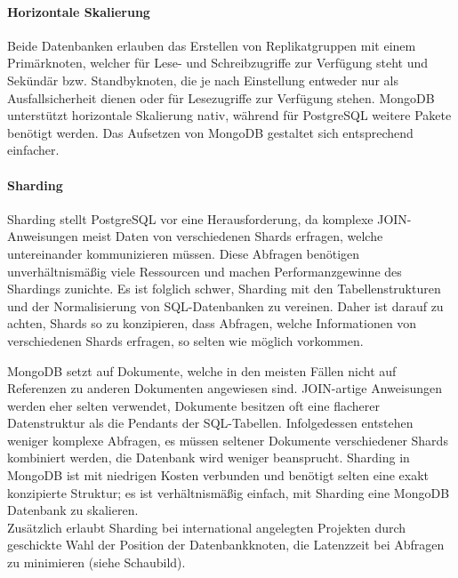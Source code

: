 \paragraph{Horizontale Skalierung\\}
Beide Datenbanken erlauben das Erstellen von Replikatgruppen mit einem Primärknoten, welcher für Lese- und Schreibzugriffe zur Verfügung steht und Sekündär bzw. Standbyknoten, die je nach Einstellung entweder nur als Ausfallsicherheit dienen oder für Lesezugriffe zur Verfügung stehen. MongoDB unterstützt horizontale Skalierung nativ, während für PostgreSQL weitere Pakete benötigt werden. \cite{MG8} Das Aufsetzen von MongoDB gestaltet sich entsprechend einfacher.

\paragraph{Sharding\\}
Sharding stellt PostgreSQL vor eine Herausforderung, da komplexe JOIN-Anweisungen meist Daten von verschiedenen Shards erfragen, welche untereinander kommunizieren müssen. Diese Abfragen benötigen unverhältnismäßig viele Ressourcen und machen Performanzgewinne des Shardings zunichte. Es ist folglich schwer, Sharding mit den Tabellenstrukturen und der Normalisierung von SQL-Datenbanken zu vereinen. Daher ist darauf zu achten, Shards so zu konzipieren, dass Abfragen, welche Informationen von verschiedenen Shards erfragen, so selten wie möglich vorkommen.

MongoDB setzt auf Dokumente, welche in den meisten Fällen nicht auf Referenzen zu anderen Dokumenten angewiesen sind. JOIN-artige Anweisungen werden eher selten verwendet, Dokumente besitzen oft eine flacherer Datenstruktur als die Pendants der SQL-Tabellen. Infolgedessen entstehen weniger komplexe Abfragen, es müssen seltener Dokumente verschiedener Shards kombiniert werden, die Datenbank wird weniger beansprucht. Sharding in MongoDB ist mit niedrigen Kosten verbunden und benötigt selten eine exakt konzipierte Struktur; es ist verhältnismäßig einfach, mit Sharding eine MongoDB Datenbank zu skalieren.\\
Zusätzlich erlaubt Sharding bei international angelegten Projekten durch geschickte Wahl der Position der Datenbankknoten, die Latenzzeit bei Abfragen zu minimieren (siehe Schaubild).

